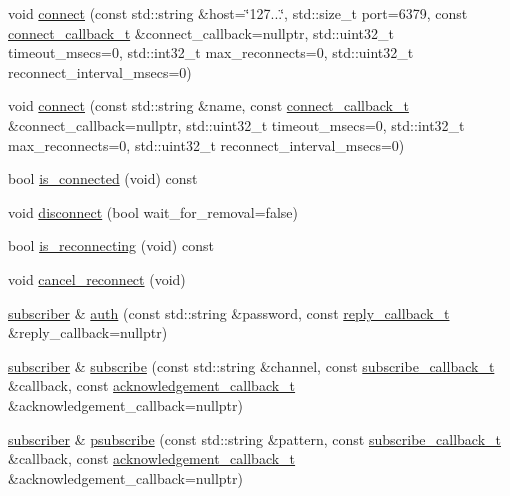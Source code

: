 \begin{DoxyCompactItemize}
void \hyperlink{classcpp__redis_1_1subscriber_a6ae8134a9a9b31d6f2434ec4f6e86d3a}{connect} (const std\+::string \&host=\char`\"{}127...\char`\"{}, std\+::size\+\_\+t port=6379, const \hyperlink{classcpp__redis_1_1subscriber_a90f2f7d4c748c3c2e89d1e977fa6dce1}{connect\+\_\+callback\+\_\+t} \&connect\+\_\+callback=nullptr, std\+::uint32\+\_\+t timeout\+\_\+msecs=0, std\+::int32\+\_\+t max\+\_\+reconnects=0, std\+::uint32\+\_\+t reconnect\+\_\+interval\+\_\+msecs=0)
\item 
void \hyperlink{classcpp__redis_1_1subscriber_a8fb77a44a1e1f0d99dec639658e2aa7e}{connect} (const std\+::string \&name, const \hyperlink{classcpp__redis_1_1subscriber_a90f2f7d4c748c3c2e89d1e977fa6dce1}{connect\+\_\+callback\+\_\+t} \&connect\+\_\+callback=nullptr, std\+::uint32\+\_\+t timeout\+\_\+msecs=0, std\+::int32\+\_\+t max\+\_\+reconnects=0, std\+::uint32\+\_\+t reconnect\+\_\+interval\+\_\+msecs=0)
\item 
bool \hyperlink{classcpp__redis_1_1subscriber_a13ff83c3944b33851dfcf364f53b146c}{is\+\_\+connected} (void) const
\item 
void \hyperlink{classcpp__redis_1_1subscriber_aad1d0c3c6edb1522eb7b1bdb64b4705d}{disconnect} (bool wait\+\_\+for\+\_\+removal=false)
\item 
bool \hyperlink{classcpp__redis_1_1subscriber_a32eb4feb4858c972ebb9887d21cb62d7}{is\+\_\+reconnecting} (void) const
\item 
void \hyperlink{classcpp__redis_1_1subscriber_a6d5bdcf7c5a67d1b56b021bbd450a7c3}{cancel\+\_\+reconnect} (void)
\item 
\hyperlink{classcpp__redis_1_1subscriber}{subscriber} \& \hyperlink{classcpp__redis_1_1subscriber_a7b4564fc4dfe356b95aeae4fdb8071c9}{auth} (const std\+::string \&password, const \hyperlink{classcpp__redis_1_1subscriber_a99d220cc662664e2399b709f61ac9581}{reply\+\_\+callback\+\_\+t} \&reply\+\_\+callback=nullptr)
\item 
\hyperlink{classcpp__redis_1_1subscriber}{subscriber} \& \hyperlink{classcpp__redis_1_1subscriber_afee579c702182041645a3d3c55de4b9e}{subscribe} (const std\+::string \&channel, const \hyperlink{classcpp__redis_1_1subscriber_ac6ab8ebc526d784e4b79a39bbd73dca8}{subscribe\+\_\+callback\+\_\+t} \&callback, const \hyperlink{classcpp__redis_1_1subscriber_a19ea39dfabeb19937a9ce4c8d21781b4}{acknowledgement\+\_\+callback\+\_\+t} \&acknowledgement\+\_\+callback=nullptr)
\item 
\hyperlink{classcpp__redis_1_1subscriber}{subscriber} \& \hyperlink{classcpp__redis_1_1subscriber_a52605edb2a85d370680c3c9e1b84fc3b}{psubscribe} (const std\+::string \&pattern, const \hyperlink{classcpp__redis_1_1subscriber_ac6ab8ebc526d784e4b79a39bbd73dca8}{subscribe\+\_\+callback\+\_\+t} \&callback, const \hyperlink{classcpp__redis_1_1subscriber_a19ea39dfabeb19937a9ce4c8d21781b4}{acknowledgement\+\_\+callback\+\_\+t} \&acknowledgement\+\_\+callback=nullptr)

\end{DoxyCompactItemize}
